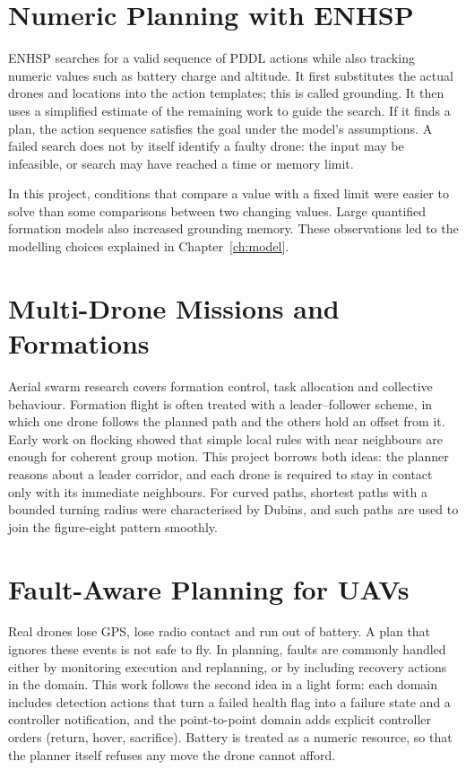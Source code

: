 \documentclass[11pt,a4paper,oneside]{report}
\begin{document}
\section{Numeric Planning with ENHSP}
ENHSP searches for a valid sequence of PDDL actions while also tracking numeric
values such as battery charge and altitude. It first substitutes the actual
drones and locations into the action templates; this is called grounding.
It then uses a simplified estimate of the remaining work to guide the search.
If it finds a plan, the action sequence satisfies the goal under the model's
assumptions. A failed search does not by itself identify a faulty drone: the
input may be infeasible, or search may have reached a time or memory limit.

In this project, conditions that compare a value with a fixed limit were easier
to solve than some comparisons between two changing values. Large quantified
formation models also increased grounding memory. These observations led to
the modelling choices explained in Chapter~\ref{ch:model}.

\section{Multi-Drone Missions and Formations}
Aerial swarm research covers formation control, task allocation and collective
behaviour. Formation flight is often treated with a
leader--follower scheme, in which one drone follows the planned path and the others hold an
offset from it. Early work on flocking showed that simple local rules with near neighbours are
enough for coherent group motion. This project borrows both ideas: the
planner reasons about a leader corridor, and each drone is required to stay in contact only with
its immediate neighbours. For curved paths, shortest paths with a bounded turning radius were
characterised by Dubins, and such paths are used to join the figure-eight
pattern smoothly.

\section{Fault-Aware Planning for UAVs}
Real drones lose GPS, lose radio contact and run out of battery. A plan that ignores these events
is not safe to fly. In planning, faults are commonly handled either by monitoring execution and
replanning, or by including recovery actions in the domain. This work follows the second idea in
a light form: each domain includes detection actions that turn a failed health flag into a failure
state and a controller notification, and the point-to-point domain adds explicit controller
orders (return, hover, sacrifice). Battery is treated as a numeric resource, so that the planner
itself refuses any move the drone cannot afford.
\end{document}

